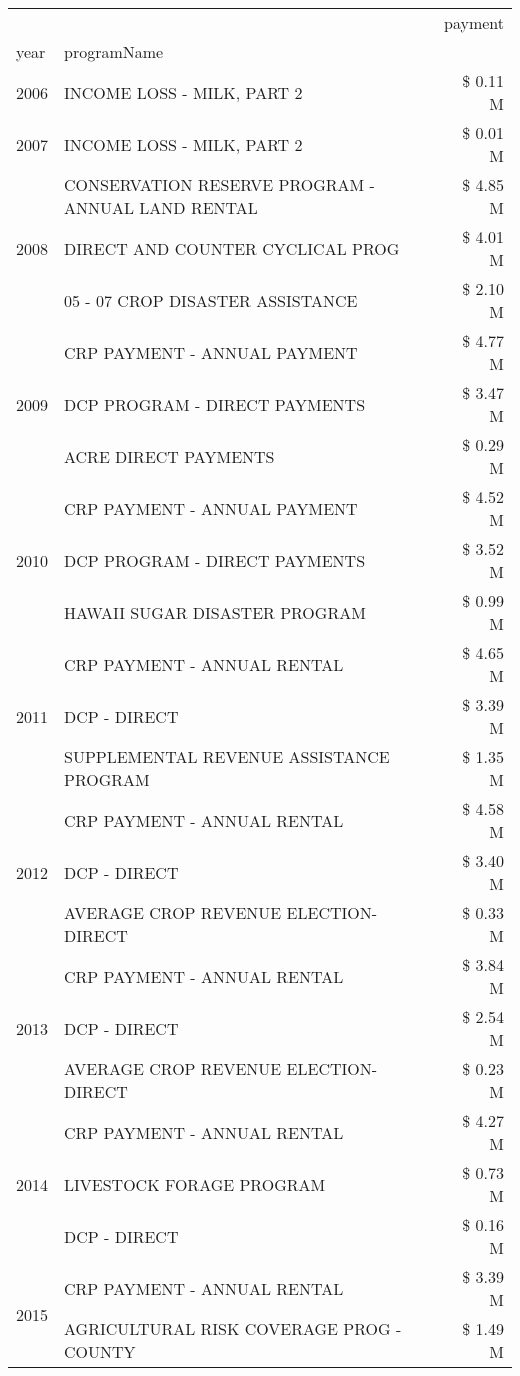 \begin{tabular}{llr}
\toprule
 &  & payment \\
year & programName &  \\
\midrule
2006 & INCOME LOSS - MILK, PART 2 & \$ 0.11 M \\
\cline{1-3}
2007 & INCOME LOSS - MILK, PART 2 & \$ 0.01 M \\
\cline{1-3}
\multirow[t]{3}{*}{2008} & CONSERVATION RESERVE PROGRAM - ANNUAL LAND RENTAL & \$ 4.85 M \\
 & DIRECT AND COUNTER CYCLICAL PROG & \$ 4.01 M \\
 & 05 - 07 CROP DISASTER ASSISTANCE & \$ 2.10 M \\
\cline{1-3}
\multirow[t]{3}{*}{2009} & CRP PAYMENT - ANNUAL PAYMENT & \$ 4.77 M \\
 & DCP PROGRAM - DIRECT PAYMENTS & \$ 3.47 M \\
 & ACRE DIRECT PAYMENTS & \$ 0.29 M \\
\cline{1-3}
\multirow[t]{3}{*}{2010} & CRP PAYMENT - ANNUAL PAYMENT & \$ 4.52 M \\
 & DCP PROGRAM - DIRECT PAYMENTS & \$ 3.52 M \\
 & HAWAII SUGAR DISASTER PROGRAM & \$ 0.99 M \\
\cline{1-3}
\multirow[t]{3}{*}{2011} & CRP PAYMENT - ANNUAL RENTAL & \$ 4.65 M \\
 & DCP - DIRECT & \$ 3.39 M \\
 & SUPPLEMENTAL REVENUE ASSISTANCE PROGRAM & \$ 1.35 M \\
\cline{1-3}
\multirow[t]{3}{*}{2012} & CRP PAYMENT - ANNUAL RENTAL & \$ 4.58 M \\
 & DCP - DIRECT & \$ 3.40 M \\
 & AVERAGE CROP REVENUE ELECTION-DIRECT & \$ 0.33 M \\
\cline{1-3}
\multirow[t]{3}{*}{2013} & CRP PAYMENT - ANNUAL RENTAL & \$ 3.84 M \\
 & DCP - DIRECT & \$ 2.54 M \\
 & AVERAGE CROP REVENUE ELECTION-DIRECT & \$ 0.23 M \\
\cline{1-3}
\multirow[t]{3}{*}{2014} & CRP PAYMENT - ANNUAL RENTAL & \$ 4.27 M \\
 & LIVESTOCK FORAGE PROGRAM & \$ 0.73 M \\
 & DCP - DIRECT & \$ 0.16 M \\
\cline{1-3}
\multirow[t]{3}{*}{2015} & CRP PAYMENT - ANNUAL RENTAL & \$ 3.39 M \\
 & AGRICULTURAL RISK COVERAGE PROG - COUNTY & \$ 1.49 M \\

\end{tabular}
